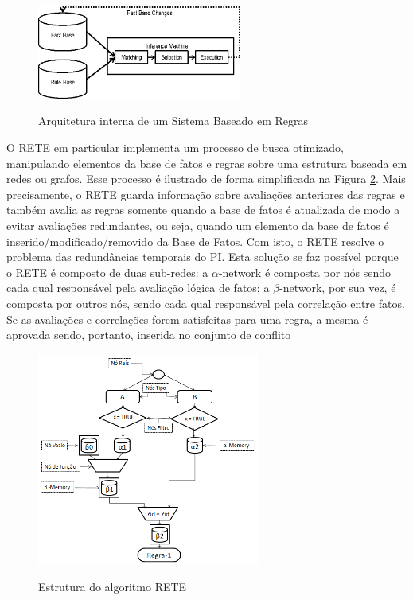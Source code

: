 \begin{figure}[!htb]
  \centering
  \caption{Arquitetura interna de um Sistema Baseado em Regras}
  \includegraphics[width=0.6\textwidth]{../figures/fact_base.png}\smallskip
  \label{fig:fact_base}
\end{figure}

O RETE em particular implementa um processo de busca otimizado, manipulando
elementos da base de fatos e regras sobre uma estrutura baseada em redes ou
grafos. Esse processo é ilustrado de forma simplificada na Figura
\ref{fig:rete}. Mais precisamente, o RETE guarda informação sobre avaliações
anteriores das regras e também avalia as regras somente quando a base de fatos é
atualizada de modo a evitar avaliações redundantes, ou seja, quando um elemento
da base de fatos é inserido/modificado/removido da Base de Fatos. Com isto, o
RETE resolve o problema das redundâncias temporais do PI. Esta solução se faz
possível porque o RETE é composto de duas sub-redes: a $\alpha$-network é composta
por nós sendo cada qual responsável pela avaliação lógica de fatos; a
$\beta$-network, por sua vez, é composta por outros nós, sendo cada qual
responsável pela correlação entre fatos. Se as avaliações e correlações forem
satisfeitas para uma regra, a mesma é aprovada sendo, portanto, inserida no
conjunto de conflito
\cite{forgy_1982,doorenbos_1995,msc_Banaszewski_2009}

\begin{figure}[!htb]
  \centering
  \caption{Estrutura do algoritmo RETE}
  \includegraphics[width=0.65\textwidth]{../figures/inference_machine.png}
  \label{fig:rete}
\end{figure}

